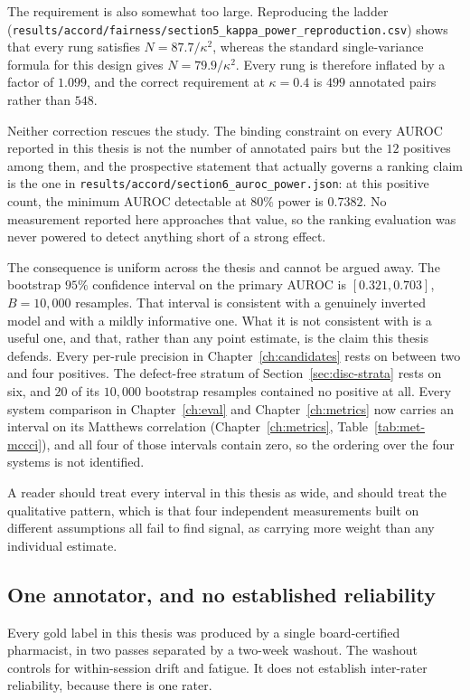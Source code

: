 The requirement is also somewhat too large. Reproducing the ladder
(\texttt{results/accord/fairness/section5\_kappa\_power\_reproduction.csv}) shows
that every rung satisfies $N = 87.7/\kappa^2$, whereas the standard
single-variance formula for this design gives $N = 79.9/\kappa^2$. Every rung is
therefore inflated by a factor of $1.099$, and the correct requirement at
$\kappa = 0.4$ is $499$ annotated pairs rather than $548$.

Neither correction rescues the study. The binding constraint on every AUROC
reported in this thesis is not the number of annotated pairs but the $12$
positives among them, and the prospective statement that actually governs a
ranking claim is the one in
\texttt{results/accord/section6\_auroc\_power.json}: at this positive count, the
minimum AUROC detectable at $80\%$ power is $0.7382$. No measurement reported
here approaches that value, so the ranking evaluation was never powered to detect
anything short of a strong effect.

The consequence is uniform across the thesis and cannot be argued away. The
bootstrap $95\%$ confidence interval on the primary AUROC is $[0.321, 0.703]$,
$B = 10{,}000$ resamples. That interval is consistent with a genuinely inverted
model and with a mildly informative one. What it is not consistent with is a
useful one, and that, rather than any point estimate, is the claim this thesis
defends. Every per-rule precision in Chapter~\ref{ch:candidates} rests on
between two and four positives. The defect-free stratum of
Section~\ref{sec:disc-strata} rests on six, and $20$ of its $10{,}000$ bootstrap
resamples contained no positive at all. Every system comparison in
Chapter~\ref{ch:eval} and Chapter~\ref{ch:metrics} now carries an interval on its
Matthews correlation (Chapter~\ref{ch:metrics}, Table~\ref{tab:met-mccci}), and
all four of those intervals contain zero, so the ordering over the four systems
is not identified.

A reader should treat every interval in this thesis as wide, and should treat
the qualitative pattern, which is that four independent measurements built on
different assumptions all fail to find signal, as carrying more weight than any
individual estimate.

\subsection{One annotator, and no established reliability}

Every gold label in this thesis was produced by a single board-certified
pharmacist, in two passes separated by a two-week washout. The washout controls
for within-session drift and fatigue. It does not establish inter-rater
reliability, because there is one rater.

